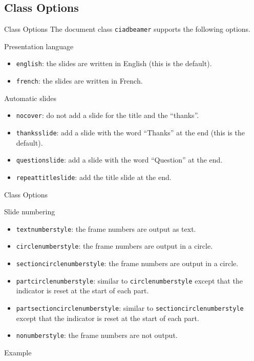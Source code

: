 \documentclass[english,sectioncirclenumberstyle]{ciadbeamer}
\begin{document}
\subsection{Class Options}

\begin{frame}[t]{Class Options}
	The document class \texttt{ciadbeamer} supports the following options.
	\begin{block}{Presentation language}
		\begin{itemize}
		\item \texttt{english}: the slides are written in English (this is the default).
		\item \texttt{french}: the slides are written in French.
		\end{itemize}
	\end{block}
	\begin{block}{Automatic slides}
		\begin{itemize}
		\item \texttt{nocover}: do not add a slide for the title and the ``thanks''.
		\item \texttt{thanksslide}: add a slide with the word ``Thanks'' at the end (this is the default). 
		\item \texttt{questionslide}: add a slide with the word ``Question'' at the end. 
		\item \texttt{repeattitleslide}: add the title slide at the end.
		\end{itemize}
	\end{block}
\end{frame}

\begin{frame}[t]{Class Options \insertcontinuationtext}
	\begin{block}{Slide numbering}
		\begin{itemize}
		\item \texttt{textnumberstyle}: the frame numbers are output as text.
		\item \texttt{circlenumberstyle}: the frame numbers are output in a circle.
		\item \texttt{sectioncirclenumberstyle}: the frame numbers are output in a circle.
		\item \texttt{partcirclenumberstyle}: similar to \texttt{circlenumberstyle} except that the indicator is reset at the start of each part.
		\item \texttt{partsectioncirclenumberstyle}: similar to \texttt{sectioncirclenumberstyle} except that the indicator is reset at the start of each part.
		\item \texttt{nonumberstyle}: the frame numbers are not output.
		\end{itemize}
	\end{block}
	\begin{block}{Example}
		\hyperlink{progressbartypes}{}
	\end{block}
\end{frame}
\end{document}
